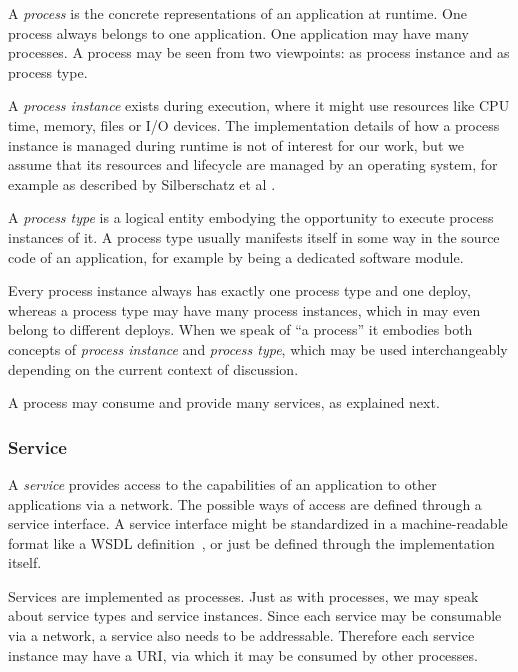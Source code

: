 A \emph{process} is the concrete representations of an application at runtime. One process always belongs to one application. One application may have many processes. A process may be seen from two viewpoints: as process instance and as process type.

A \emph{process instance} exists during execution, where it might use resources like CPU time, memory, files or I/O devices. The implementation details of how a process instance is managed during runtime is not of interest for our work, but we assume that its resources and lifecycle are managed by an operating system, for example as described by Silberschatz et al \cite{silberschatz1998operating}.

A \emph{process type} is a logical entity embodying the opportunity to execute process instances of it. A process type usually manifests itself in some way in the source code of an application, for example by being a dedicated software module.

Every process instance always has exactly one process type and one deploy, whereas a process type may have many process instances, which in may even belong to different deploys. When we speak of ``a process'' it embodies both concepts of \emph{process instance} and \emph{process type}, which may be used interchangeably depending on the current context of discussion.

A process may consume and provide many services, as explained next.


\subsubsection{Service}

A \emph{service} provides access to the capabilities of an application to other applications via a network. The possible ways of access are defined through a service interface. A service interface might be standardized in a machine-readable format like a WSDL definition~\cite{wsw3c}, or just be defined through the implementation itself.

Services are implemented as processes. Just as with processes, we may speak about service types and service instances. Since each service may be consumable via a network, a service also needs to be addressable. Therefore each service instance may have a URI, via which it may be consumed by other processes.

